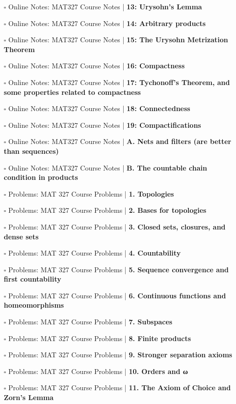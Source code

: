 \documentclass[a4, landscape, 12pt]{article}
\newcommand{\checkbox}{$\square$}%
\begin{document}
\begin{itemize}
\item [\checkbox] Online Notes: MAT327 Course Notes  | \textbf{13: Urysohn's Lemma
}
\item [\checkbox] Online Notes: MAT327 Course Notes  | \textbf{14: Arbitrary products
}
\item [\checkbox] Online Notes: MAT327 Course Notes  | \textbf{15: The Urysohn Metrization Theorem
}
\item [\checkbox] Online Notes: MAT327 Course Notes  | \textbf{16: Compactness
}
\item [\checkbox] Online Notes: MAT327 Course Notes  | \textbf{17: Tychonoff's Theorem, and some properties related to compactness
}
\item [\checkbox] Online Notes: MAT327 Course Notes  | \textbf{18: Connectedness
}
\item [\checkbox] Online Notes: MAT327 Course Notes  | \textbf{19: Compactifications
}
\item [\checkbox] Online Notes: MAT327 Course Notes  | \textbf{A. Nets and filters (are better than sequences)
}
\item [\checkbox] Online Notes: MAT327 Course Notes  | \textbf{B. The countable chain condition in products
}
\item [\checkbox] Problems: MAT 327 Course Problems  | \textbf{1. Topologies
}
\item [\checkbox] Problems: MAT 327 Course Problems  | \textbf{2. Bases for topologies
}
\item [\checkbox] Problems: MAT 327 Course Problems  | \textbf{3. Closed sets, closures, and dense sets
}
\item [\checkbox] Problems: MAT 327 Course Problems  | \textbf{4. Countability
}
\item [\checkbox] Problems: MAT 327 Course Problems  | \textbf{5. Sequence convergence and first countability
}
\item [\checkbox] Problems: MAT 327 Course Problems  | \textbf{6. Continuous functions and homeomorphisms
}
\item [\checkbox] Problems: MAT 327 Course Problems  | \textbf{7. Subspaces
}
\item [\checkbox] Problems: MAT 327 Course Problems  | \textbf{8. Finite products
}
\item [\checkbox] Problems: MAT 327 Course Problems  | \textbf{9. Stronger separation axioms
}
\item [\checkbox] Problems: MAT 327 Course Problems  | \textbf{10. Orders and ω
}
\item [\checkbox] Problems: MAT 327 Course Problems  | \textbf{11. The Axiom of Choice and Zorn’s Lemma
}
\end{itemize}
\end{document}
